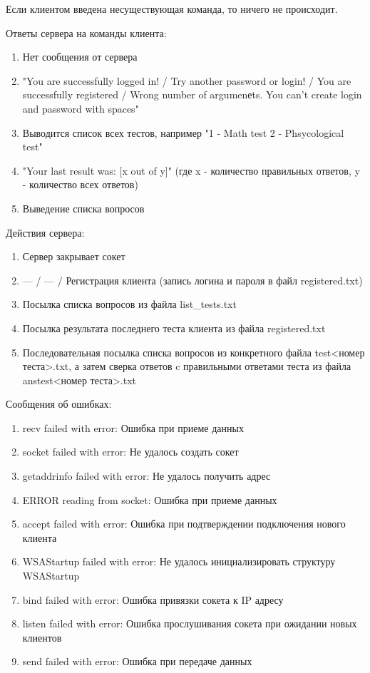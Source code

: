 Если клиентом введена несуществующая команда, то ничего не происходит. 

Ответы сервера на команды клиента:

\begin{enumerate}
\item Нет сообщения от сервера
\item "You are successfully logged in! / Try another password or login! / You are successfully registered / Wrong number of argumenеts. You can't create login and password with spaces"
\item Выводится список всех тестов, например "1 - Math test 2 - Phsycological test"
\item "Your last result was: [x out of y]" (где x - количество правильных ответов, y - количество всех ответов)
\item Выведение списка вопросов
\end{enumerate}

Действия сервера:

\begin{enumerate}
\item Сервер закрывает сокет
\item --- / --- / Регистрация клиента (запись логина и пароля в файл registered.txt)
\item Посылка списка вопросов из файла list\_tests.txt
\item Посылка результата последнего теста клиента из файла registered.txt
\item Последовательная посылка списка вопросов из конкретного файла test<номер теста>.txt, а затем сверка ответов c правильными ответами теста из файла anstest<номер теста>.txt
\end{enumerate}
\vspace{3mm}
Сообщения об ошибках:
\vspace{3mm}
\begin{enumerate}
\item recv failed with error: Ошибка при приеме данных
\item socket failed with error: Не удалось создать сокет
\item getaddrinfo failed with error: Не удалось получить адрес
\item ERROR reading from socket: Ошибка при приеме данных
\item accept failed with error: Ошибка при подтверждении подключения нового клиента
\item WSAStartup failed with error: Не удалось инициализировать структуру WSAStartup
\item bind failed with error: Ошибка привязки сокета к IP адресу
\item listen failed with error: Ошибка прослушивания сокета при ожидании новых клиентов
\item send failed with error: Ошибка при передаче данных
\end{enumerate}

